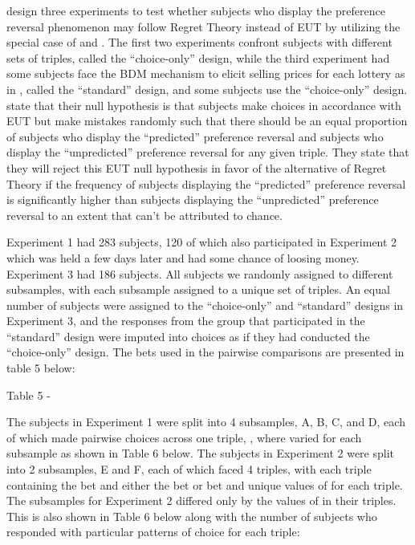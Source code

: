 \textcite{Loomes1989} design three experiments to test whether subjects who display the preference reversal phenomenon may follow Regret Theory instead of EUT by utilizing the special case of  and .
The first two experiments confront subjects with different sets of triples, called the \enquote{choice-only} design, while the third experiment had some subjects face the BDM mechanism to elicit selling prices for each lottery as in \textcite{Grether1979}, called the \enquote{standard} design, and some subjects use the \enquote{choice-only} design.
\textcite[142]{Loomes1989} state that their null hypothesis is that subjects make choices in accordance with EUT but make mistakes randomly such that there should be an equal proportion of subjects who display the \enquote{predicted} preference reversal and subjects who display the \enquote{unpredicted} preference reversal for any given triple.
They state that they will reject this EUT null hypothesis in favor of the alternative of Regret Theory if the frequency of subjects displaying the \enquote{predicted} preference reversal is significantly higher than subjects displaying the \enquote{unpredicted} preference reversal to an extent that can't be attributed to chance.

Experiment 1 had 283 subjects, 120 of which also participated in Experiment 2 which was held a few days later and had some chance of loosing money.
Experiment 3 had 186 subjects.
All subjects we randomly assigned to different subsamples, with each subsample assigned to a unique set of triples.
An equal number of subjects were assigned to the \enquote{choice-only} and \enquote{standard} designs in Experiment 3, and the responses from the group that participated in the \enquote{standard} design were imputed into choices as if they had conducted the \enquote{choice-only} design.
The bets used in the pairwise comparisons are presented in table 5 below:

Table 5 -  \textcite{Loomes1989}

The subjects in Experiment 1 were split into 4 subsamples, A, B, C, and D, each of which made pairwise choices across one triple, , where  varied for each subsample as shown in Table 6 below.
The subjects in Experiment 2 were split into 2 subsamples, E and F, each of which faced 4 triples, with each triple containing the  bet and either the  bet or  bet and unique values of  for each triple.
The subsamples for Experiment 2 differed only by the values of  in their triples.
This is also shown in Table 6 below along with the number of subjects who responded with particular patterns of choice for each triple:



